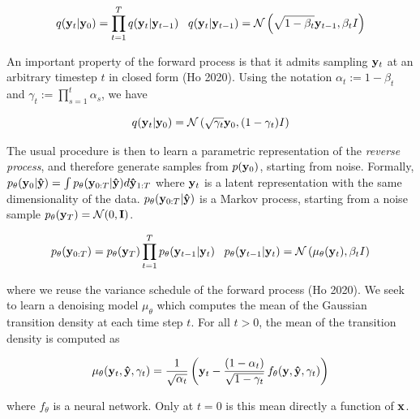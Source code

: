 \documentclass{article}
\begin{document}
\begin{equation}
q(\bold{y}_{t}|\bold{y}_{0}) = \prod_{t=1}^{T}q(\bold{y}_{t}|\bold{y}_{t-1}) \;\;\; q(\bold{y}_{t}|\bold{y}_{t-1}) = \mathcal{N}\left(\sqrt{1-\beta_{t}}\bold{y}_{t-1},\beta_t I\right)
\end{equation}

An important property of the forward process is that it admits sampling $\bold{y}_t$ at an arbitrary timestep $t$ in closed form (Ho 2020). Using the notation $\alpha_t := 1 - \beta_t$ and $\gamma_t := \prod_{s=1}^{t} \alpha_s$, we have

\begin{equation}
q(\bold{y}_t|\bold{y}_0) = \mathcal{N} \left(\sqrt{\gamma_{t}} \bold{y}_{0}, (1 - \gamma_t)I \right)
\end{equation}


The usual procedure is then to learn a parametric representation of the \emph{reverse process}, and therefore generate samples from  $p(\bold{y}_{0})$, starting from noise. Formally, $p_{\theta}(\bold{y}_{0}|\bold{\hat{y}}) = \int p_{\theta}(\bold{y}_{0:T}|\bold{\hat{y}})d\bold{\hat{y}}_{1:T}$ where $\bold{y}_{t}$ is a latent representation with the same dimensionality of the data.  $p_{\theta}(\bold{y}_{0:T}|\bold{\hat{y}})$ is a Markov process, starting from a noise sample $p_{\theta}(\bold{y}_{T}) = \mathcal{N}(0,\bold{I})$. 

\begin{equation}
p_{\theta}(\bold{y}_{0:T}) = p_{\theta}(\bold{y}_{T})\prod_{t=1}^{T} p_{\theta}(\bold{y}_{t-1}|\bold{y}_{t}) \;\;\; p_{\theta}(\bold{y}_{t-1}|\bold{y}_{t}) = \mathcal{N}\left(\mu_{\theta}(\bold{y}_{t}),\beta_{t}I\right)
\end{equation}

where we reuse the variance schedule of the forward process (Ho 2020). We seek to learn a denoising model $\mu_{\theta}$ which computes the mean of the Gaussian transition density at each time step $t$. For all $t > 0$, the mean of the transition density is computed as

\begin{equation}
\mu_{\theta}(\bold{y}_t, \bold{\hat{y}}, \gamma_t) = \frac{1}{\sqrt{\alpha_t}} \left(\bold{y}_t - \frac{(1 - \alpha_t)}{\sqrt{1 - \gamma_t}} \, f_{\theta}(\bold{y}, \bold{\hat{y}}, \gamma_t) \right)
\end{equation}

where $f_{\theta}$ is a neural network. Only at $t=0$ is this mean directly a function of $\bold{x}$. 
\end{document}
